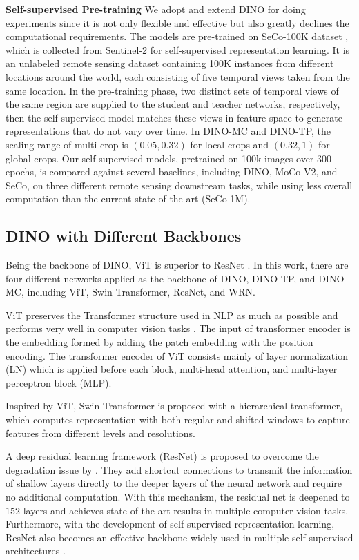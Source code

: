 \documentclass[10pt,twocolumn,letterpaper]{article}
\begin{document}
\textbf{Self-supervised Pre-training } 
We adopt and extend DINO for doing experiments since it is not only flexible and effective but also greatly declines the computational requirements.
The models are pre-trained on SeCo-100K dataset \cite{manas2021seasonal}, which is collected from Sentinel-2 \cite{drusch2012sentinel} for self-supervised representation learning.
It is an unlabeled remote sensing dataset containing 100K instances from different locations around the world, each consisting of five temporal views taken from the same location.
In the pre-training phase, two distinct sets of temporal views of the same region are supplied to the student and teacher networks, respectively, then the self-supervised model matches these views in feature space to generate representations that do not vary over time.
In DINO-MC and DINO-TP, the scaling range of multi-crop is $(0.05, 0.32)$ for local crops and $(0.32, 1)$ for global crops.
Our self-supervised models, pretrained on 100k images over 300 epochs, is compared against several baselines, including DINO, MoCo-V2, and SeCo, on three different remote sensing downstream tasks, while using less overall computation than the current state of the art (SeCo-1M).


\subsection{DINO with Different Backbones}
Being the backbone of DINO, ViT is superior to ResNet \cite{caron2021emerging}.
In this work, there are four different networks applied as the backbone of DINO, DINO-TP, and DINO-MC, including ViT, Swin Transformer, ResNet, and WRN.

ViT preserves the Transformer structure used in NLP as much as possible and performs very well in computer vision tasks \cite{dosovitskiy2020image}.
The input of transformer encoder is the embedding formed by adding the patch embedding with the position encoding.
The transformer encoder of ViT consists mainly of layer normalization (LN) which is applied before each block, multi-head attention, and multi-layer perceptron block (MLP).

Inspired by ViT, Swin Transformer is proposed with a hierarchical transformer, which computes representation with both regular and shifted windows to capture features from different levels and resolutions. 


A deep residual learning framework (ResNet) is proposed to overcome the degradation issue by \cite{he2016deep}.
They add shortcut connections to transmit the information of shallow layers directly to the deeper layers of the neural network and require no additional computation.
With this mechanism, the residual net is deepened to $152$ layers and achieves state-of-the-art results in multiple computer vision tasks. 
Furthermore, with the development of self-supervised representation learning, ResNet also becomes an effective backbone widely used in multiple self-supervised architectures \cite{chen2020simple, grill2020bootstrap, oord2018representation, tian2020contrastive, misra2020self}. 
\end{document}

